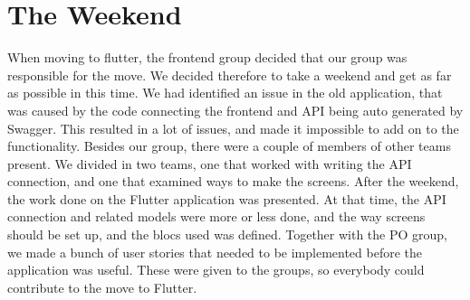 \section{The Weekend}
When moving to flutter, the frontend group decided that our group was responsible for the move. 
We decided therefore to take a weekend and get as far as possible in this time. 
We had identified an issue in the old application, that was caused by the code connecting the frontend and API being auto generated by Swagger. 
This resulted in a lot of issues, and made it impossible to add on to the functionality. 
Besides our group, there were a couple of members of other teams present.
We divided in two teams, one that worked with writing the API connection, and one that examined ways to make the screens.
After the weekend, the work done on the Flutter application was presented. 
At that time, the API connection and related models were more or less done, and the way screens should be set up, and the blocs used was defined. 
Together with the PO group, we made a bunch of user stories that needed to be implemented before the application was useful. These were given to the groups, so everybody could contribute to the move to Flutter. 